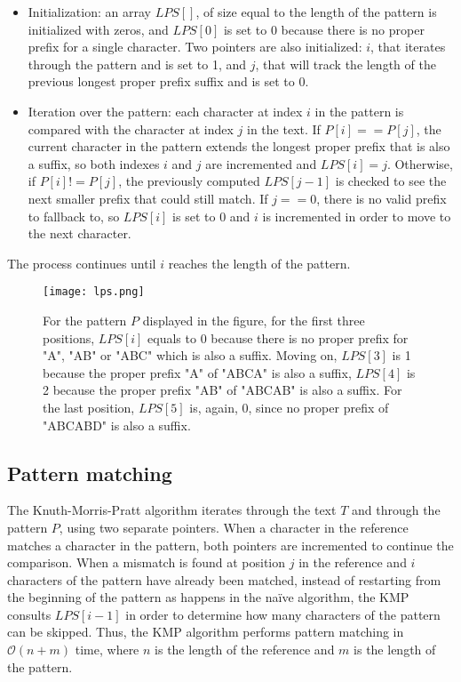 \begin{itemize}
\item Initialization: an array \( LPS[] \), of size equal to the length of the pattern is initialized with zeros, and \( LPS[0] \) is set to 0 because there is no proper prefix for a single character. Two pointers are also initialized: \( i \), that iterates through the pattern and is set to 1, and \( j \), that will track the length of the previous longest proper prefix suffix and is set to 0.
\item Iteration over the pattern: each character at index \( i \) in the pattern is compared with the character at index \( j \) in the text. If \( P[i] == P[j] \), the current character in the pattern extends the longest proper prefix that is also a suffix, so both indexes \( i \) and \( j \) are incremented and \( LPS[i] = j\). Otherwise, if \( P[i] != P[j] \), the previously computed \( LPS[j-1] \) is checked to see the next smaller prefix that could still match. If \( j == 0 \), there is no valid prefix to fallback to, so \( LPS[i] \) is set to 0 and \( i \) is incremented in order to move to the next character. 
\end{itemize}

The process continues until \( i\) reaches the length of the pattern.

\begin{figure}[h]

  \centering
    \texttt{[image: lps.png]}

  \caption{For the pattern \( P \) displayed in the figure, for the first three positions, \( LPS[i] \) equals to 0 because there is no proper prefix for "A", "AB" or "ABC" which is also a suffix. Moving on, \( LPS[3] \) is 1 because the proper prefix "A" of "ABCA" is also a suffix, \( LPS[4] \) is 2 because the proper prefix "AB" of "ABCAB" is also a suffix. For the last position, \( LPS[5] \) is, again, 0, since no proper prefix of "ABCABD" is also a suffix.}
  \label{fig:lps}
\end{figure}

\subsection{Pattern matching}

The Knuth-Morris-Pratt algorithm iterates through the text \( T \) and through the pattern \( P \), using two separate pointers. When a character in the reference matches a character in the pattern, both pointers are incremented to continue the comparison. 
When a mismatch is found at position  \( j \) in the reference and \( i \) characters of the pattern have already been matched, instead of restarting from the beginning of the pattern as happens in the naïve algorithm, the KMP consults \( LPS[i-1] \) in order to determine how many characters of the pattern can be skipped. Thus, the KMP algorithm performs pattern matching in $\mathcal{O}(n + m)$ time, where \( n \) is the length of the reference and \( m \) is the length of the pattern.


